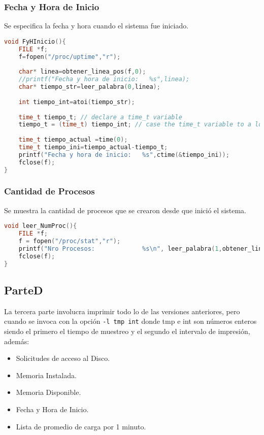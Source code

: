 \documentclass{article}
\begin{document}
\subsubsection*{Fecha y Hora de Inicio}
Se especifica la fecha y hora cuando el sistema fue iniciado.
{\fontfamily{\ttdefault}\selectfont
\begin{lstlisting}[language=c,caption=Función FyHInicio()., breaklines=true] 
void FyHInicio(){
	FILE *f;
	f=fopen("/proc/uptime","r");
	
	char* linea=obtener_linea_pos(f,0);
	//printf("Fecha y hora de inicio:   %s",linea);
	char* tiempo_str=leer_palabra(0,linea);
	
	int tiempo_int=atoi(tiempo_str);
	
	time_t tiempo_t; // declare a time_t variable
	tiempo_t = (time_t) tiempo_int; // case the time_t variable to a long int
	
	time_t tiempo_actual =time(0);
	time_t tiempo_ini=tiempo_actual-tiempo_t;
	printf("Fecha y hora de inicio:   %s",ctime(&tiempo_ini));
	fclose(f);
}
\end{lstlisting}}
\subsubsection*{Cantidad de Procesos}
Se muestra la cantidad de procesos que se crearon desde que inició el sistema.
{\fontfamily{\ttdefault}\selectfont
\begin{lstlisting}[language=c,caption=Función leer\_NumProc()., breaklines=true] 
void leer_NumProc(){
	FILE *f;
	f = fopen("/proc/stat","r");
	printf("Nro Procesos:             %s\n", leer_palabra(1,obtener_linea_pos(f,nro_linea_con_palabra(f,"processes"))));
	fclose(f);
}
\end{lstlisting}}
\subsection{ParteD}
La tercera parte involucra imprimir todo lo de las versiones anteriores, pero cuando se invoca con la opción \verb+-l tmp int+ donde tmp e int son números enteros siendo el primero el tiempo de muestreo y el segundo el intervalo de impresión, además:
\begin{itemize}
\item Solicitudes de acceso al Disco.
\item Memoria Instalada.
\item Memoria Disponible.
\item Fecha y Hora de Inicio.
\item Lista de promedio de carga por 1 minuto.
\end{itemize}
\end{document}
